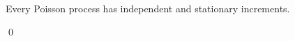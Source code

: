
\vskip 0.5cm
\begin{corollary}
\mbox{}
\vskip 0.15cm
\noindent
Every Poisson process has independent and stationary increments.
\end{corollary}
\proof

\qed


\renewcommand{\theenumi}{\roman{enumi}}
\renewcommand{\labelenumi}{\textnormal{(\theenumi)}$\;\;$}

